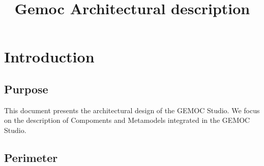 \documentclass{gemoc} %
\title{Gemoc Architectural description}
\begin{document}
\maketitle

\begin{revisions}
	\begin{revtable}
	\end{revtable}
	\begin{revisionlabels}
	\end{revisionlabels}
\end{revisions}

\begin{tableofauthors}
\end{tableofauthors}

\tableofcontents
\newpage

\chapter{Introduction}


\section{Purpose}
This document presents the architectural design of the GEMOC Studio. We focus on 
the description of  Compoments and Metamodels integrated in the GEMOC Studio.

\section{Perimeter}

\end{document}
